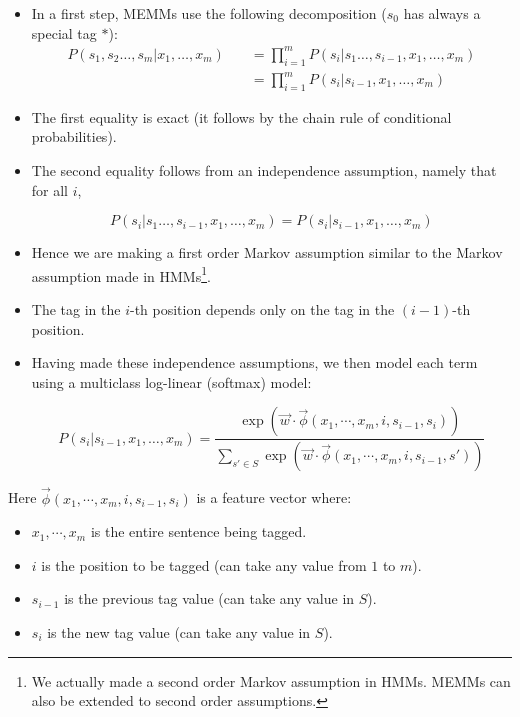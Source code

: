 \begin{itemize}
 \item In a first step, MEMMs use the following decomposition ($s_0$ has always a special tag $*$):
 \begin{equation}
\begin{split}
  P(s_1,s_2 \dots, s_m | x_1, \dots, x_m) \quad & =  \prod_{i=1}^{m}    P(s_i | s_1 \dots, s_{i-1}, x_1, \dots, x_m)\\
 \quad & =  \prod_{i=1}^{m}    P(s_i | s_{i-1}, x_1, \dots, x_m)
\end{split}
\end{equation}

\item The first equality is exact (it follows by the chain rule of conditional probabilities).

\item The second equality follows from an independence assumption, namely that for all $i$,

\begin{displaymath}
 P(s_i | s_1 \dots, s_{i-1}, x_1, \dots, x_m) =   P(s_i | s_{i-1}, x_1, \dots, x_m)
\end{displaymath}

\item Hence we are making a first order Markov assumption similar to the Markov assumption made in HMMs\footnote{We actually made a second order Markov assumption in HMMs. MEMMs can also be extended to second order assumptions.}. 
 
\item The tag in the $i$-th position depends only on the tag in the $(i -1)$-th position. 
 
 
\item Having made these independence assumptions, we then model each term using a multiclass log-linear (softmax) model:
 
 \begin{equation}
 P(s_i | s_{i-1}, x_1, \dots, x_m)  =  \frac{\exp (\vec{w}\cdot \vec{\phi}(x_1, \cdots, x_m, i, s_{i-1},s_i))}{\sum_{s' \in S} \exp (\vec{w}\cdot \vec{\phi}(x_1, \cdots, x_m, i, s_{i-1},s'))}
\end{equation}
 
\end{itemize}

Here $\vec{\phi}(x_1, \cdots, x_m, i, s_{i-1},s_i)$ is a feature vector where:
\begin{itemize}
 \item $x_1, \cdots, x_m$ is the entire sentence being tagged.
  \item $i$ is the position to be tagged (can take any value from $1$ to $m$).
  \item $s_{i-1}$ is the previous tag value (can take any value in $S$).
  \item $s_i$ is the new tag value (can take any value in $S$).
 
\end{itemize}

